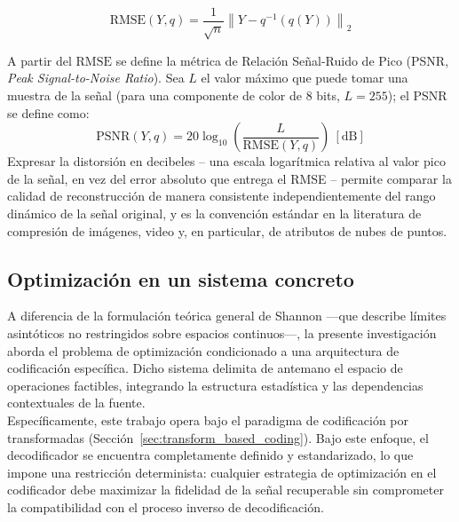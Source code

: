         \begin{equation}
            \mathrm{RMSE}(Y, q) = \frac{1}{\sqrt{n}} \left\| Y - q^{-1}(q(Y)) \right\|_2
        \label{eq: rmse_dist}
        \end{equation}

        A partir del $\mathrm{RMSE}$ se define la métrica de Relación Señal-Ruido de Pico (PSNR, \textit{Peak Signal-to-Noise
        Ratio}). Sea $L$ el valor máximo que puede tomar una muestra de la señal (para una
        componente de color de 8 bits, $L=255$); el PSNR se define como:
        \begin{equation}
            \mathrm{PSNR}(Y, q) = 20 \log_{10}\left( \frac{L}{\mathrm{RMSE}(Y,q)} \right) \ [\text{dB}]
        \label{eq: psnr_dist}
        \end{equation}
        Expresar la distorsión en decibeles -- una escala logarítmica relativa al valor pico de la
        señal, en vez del error absoluto que entrega el RMSE -- permite comparar la calidad de
        reconstrucción de manera consistente independientemente del rango dinámico de la señal
        original, y es la convención estándar en la literatura de compresión de imágenes, video y,
        en particular, de atributos de nubes de puntos.

    \subsection{Optimización en un sistema concreto}
        A diferencia de la formulación teórica general de Shannon —que describe límites asintóticos no restringidos sobre espacios continuos—, la presente investigación aborda el problema de optimización condicionado a una arquitectura de codificación específica. Dicho sistema delimita de antemano el espacio de operaciones factibles, integrando la estructura estadística y las dependencias contextuales de la fuente.\\

        Específicamente, este trabajo opera bajo el paradigma de codificación por transformadas (Sección~\ref{sec:transform_based_coding}). Bajo este enfoque, el decodificador se encuentra completamente definido y estandarizado, lo que impone una restricción determinista: cualquier estrategia de optimización en el codificador debe maximizar la fidelidad de la señal recuperable sin comprometer la compatibilidad con el proceso inverso de decodificación.\\

